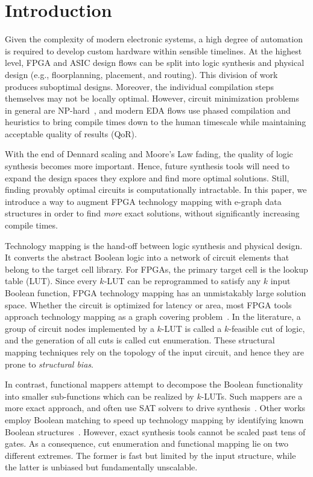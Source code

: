 \section{Introduction}\label{sec:intro}
Given the complexity of modern electronic systems, a high degree of automation
is required to develop custom hardware within sensible timelines. At the
highest level, FPGA and ASIC design flows can be split into logic synthesis and
physical design (e.g., floorplanning, placement, and routing). This division of
work produces suboptimal designs. Moreover, the individual compilation steps
themselves may not be locally optimal. However, circuit minimization problems
in general are NP-hard~\cite{logicmin,twolevellogic}, and modern EDA flows use
phased compilation and heuristics to bring compile times down to the human
timescale while maintaining acceptable quality of results (QoR).

With the end of Dennard scaling and Moore's Law fading, the quality of logic
synthesis becomes more important. Hence, future synthesis tools will need to
expand the design spaces they explore and find more optimal solutions. Still,
finding provably optimal circuits is computationally intractable. In this
paper, we introduce a way to augment FPGA technology mapping with e-graph data
structures in order to find \textit{more} exact solutions, without
significantly increasing compile times.

Technology mapping is the hand-off between logic synthesis and physical design.
It converts the abstract Boolean logic into a network of circuit elements that
belong to the target cell library. For FPGAs, the primary target cell is the
lookup table (LUT). Since every $k$-LUT can be reprogrammed to satisfy any $k$
input Boolean function, FPGA technology mapping has an unmistakably large
solution space. Whether the circuit is optimized for latency or area, most FPGA
tools approach technology mapping as a graph covering problem~\cite{flowmap,
    daomap, attmap, imap}. In the literature, a group of circuit nodes implemented
by a $k$-LUT is called a $k$-feasible cut of logic, and the generation of all
cuts is called cut enumeration. These structural mapping techniques rely on the
topology of the input circuit, and hence they are prone to \textit{structural
    bias}.

In contrast, functional mappers attempt to decompose the Boolean functionality
into smaller sub-functions which can be realized by $k$-LUTs. Such mappers are
a more exact approach, and often use SAT solvers to drive
synthesis~\cite{satmap,satmap2}. Other works employ Boolean matching to speed
up technology mapping by identifying known Boolean
structures~\cite{boolmatch,fastboolmatch}. However, exact synthesis tools
cannot be scaled past tens of gates. As a consequence, cut enumeration and
functional mapping lie on two different extremes. The former is fast but
limited by the input structure, while the latter is unbiased but fundamentally
unscalable.

